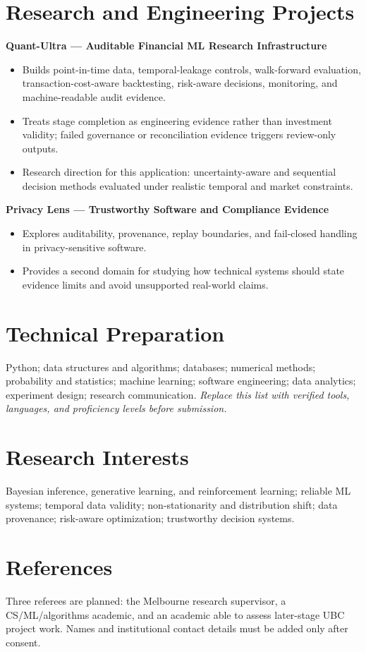 \documentclass[11pt]{article}
\begin{document}
\section*{Research and Engineering Projects}
\textbf{Quant-Ultra --- Auditable Financial ML Research Infrastructure}
\begin{itemize}
\item Builds point-in-time data, temporal-leakage controls, walk-forward evaluation, transaction-cost-aware backtesting, risk-aware decisions, monitoring, and machine-readable audit evidence.
\item Treats stage completion as engineering evidence rather than investment validity; failed governance or reconciliation evidence triggers review-only outputs.
\item Research direction for this application: uncertainty-aware and sequential decision methods evaluated under realistic temporal and market constraints.
\end{itemize}

\textbf{Privacy Lens --- Trustworthy Software and Compliance Evidence}
\begin{itemize}
\item Explores auditability, provenance, replay boundaries, and fail-closed handling in privacy-sensitive software.
\item Provides a second domain for studying how technical systems should state evidence limits and avoid unsupported real-world claims.
\end{itemize}

\section*{Technical Preparation}
Python; data structures and algorithms; databases; numerical methods; probability and statistics; machine learning; software engineering; data analytics; experiment design; research communication. \textit{Replace this list with verified tools, languages, and proficiency levels before submission.}

\section*{Research Interests}
Bayesian inference, generative learning, and reinforcement learning; reliable ML systems; temporal data validity; non-stationarity and distribution shift; data provenance; risk-aware optimization; trustworthy decision systems.

\section*{References}
Three referees are planned: the Melbourne research supervisor, a CS/ML/algorithms academic, and an academic able to assess later-stage UBC project work. Names and institutional contact details must be added only after consent.
\end{document}
